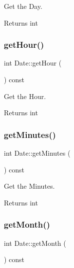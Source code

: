 Get the Day. 

\begin{DoxyReturn}{Returns}
int 
\end{DoxyReturn}
\mbox{\label{classDate_ab8ea9e1aafa6cb95be7b82cda0c53cfe}} 
\subsubsection{\texorpdfstring{get\+Hour()}{getHour()}}
{\footnotesize\ttfamily int Date\+::get\+Hour (\begin{DoxyParamCaption}{ }\end{DoxyParamCaption}) const}



Get the Hour. 

\begin{DoxyReturn}{Returns}
int 
\end{DoxyReturn}
\mbox{\label{classDate_a55251df891f43b9f19419cd79ce69876}} 
\subsubsection{\texorpdfstring{get\+Minutes()}{getMinutes()}}
{\footnotesize\ttfamily int Date\+::get\+Minutes (\begin{DoxyParamCaption}{ }\end{DoxyParamCaption}) const}



Get the Minutes. 

\begin{DoxyReturn}{Returns}
int 
\end{DoxyReturn}
\mbox{\label{classDate_a332f6e3a2f6a40d73742b6dab7be0f64}} 
\subsubsection{\texorpdfstring{get\+Month()}{getMonth()}}
{\footnotesize\ttfamily int Date\+::get\+Month (\begin{DoxyParamCaption}{ }\end{DoxyParamCaption}) const}



